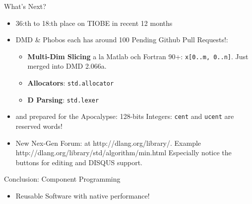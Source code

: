 \documentclass[xcolor=dvipsnames]{beamer}
\begin{document}
\begin{frame}[fragile]{What's Next?}
  \begin{itemize}[<+->]
  \item 36:th to 18:th place on TIOBE in recent 12 months
  \item DMD \& Phobos each has around 100 Pending Github Pull Requests!:
    \begin{itemize}[<+->]
    \item \textbf{Multi-Dim Slicing} a la Matlab och Fortran 90+:
      \texttt{x[0..m, 0..n]}. Just merged into DMD 2.066a.
    \item \textbf{Allocators}: \texttt{std.allocator}
    \item \textbf{D Parsing}: \texttt{std.lexer}
    \end{itemize}
  \item and prepared for the Apocalypse: 128-bits Integers: \texttt{cent} and
    \texttt{ucent} are reserved words!
  \item New Nex-Gen Forum: at http://dlang.org/library/. Example
    http://dlang.org/library/std/algorithm/min.html
    Especially notice the buttons for editing and DISQUS support.
  \end{itemize}
\end{frame}

\begin{frame}[fragile]{Conclusion: Component Programming}
  \begin{figure}
  \end{figure}
  \begin{itemize}[<+->]
  Features come together in an elegant and concise harmony =>
  \item Reusable Software with native performance!
  \end{itemize}
\end{frame}
\end{document}
